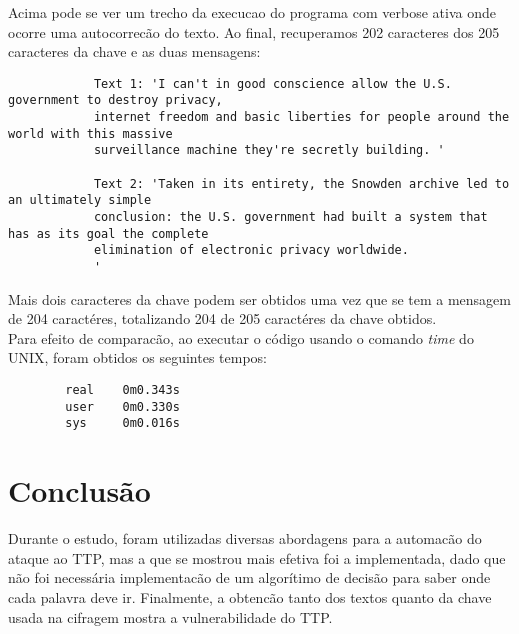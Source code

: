 \documentclass[10pt]{article}
\begin{document}
    	Acima pode se ver um trecho da execucao do programa com verbose ativa onde ocorre uma autocorrecão do texto. Ao final, recuperamos 202 caracteres dos 205 caracteres da chave e as duas mensagens: 

    	\begin{verbatim}
			Text 1: 'I can't in good conscience allow the U.S. government to destroy privacy, 
			internet freedom and basic liberties for people around the world with this massive 
			surveillance machine they're secretly building. '

			Text 2: 'Taken in its entirety, the Snowden archive led to an ultimately simple 
			conclusion: the U.S. government had built a system that has as its goal the complete 
			elimination of electronic privacy worldwide. 
			'
    	\end{verbatim}

    	Mais dois caracteres da chave podem ser obtidos uma vez que se tem a mensagem de 204 caractéres, totalizando 204 de 205 caractéres da chave obtidos.\\

    	Para efeito de comparacão, ao executar o código usando o comando \textit{time} do UNIX, foram obtidos os seguintes tempos:

    	\begin{verbatim}
		real	0m0.343s
		user	0m0.330s
		sys		0m0.016s
    	\end{verbatim}

    	

    	\newpage

    \section{Conclusão}
    	Durante o estudo, foram utilizadas diversas abordagens para a automacão do ataque ao TTP, mas a que se mostrou mais efetiva foi a implementada, dado que não foi necessária implementacão de um algorítimo de decisão para saber onde cada palavra deve ir. Finalmente, a obtencão tanto dos textos quanto da chave usada na cifragem mostra a vulnerabilidade do TTP.	
\end{document}
